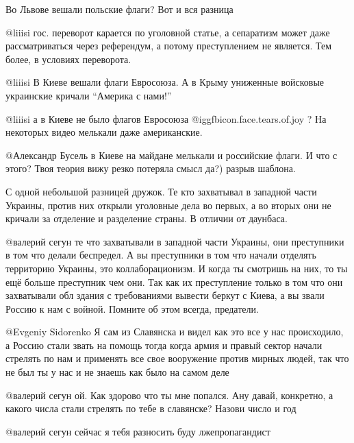 \begin{multicols}{2}
\begin{itemize}
Во Львове вешали польские флаги? Вот и вся разница


@liiisi  гос. переворот карается по  уголовной статье, а сепаратизм может даже
рассматриваться через референдум, а потому преступлением не является. Тем
более, в условиях переворота.

@liiisi  В Киеве вешали флаги Евросоюза. А в Крыму униженные войсковые
украинские кричали \enquote{Америка с нами!}


@liiisi  а в Киеве не было флагов Евросоюза  @igg{fbicon.face.tears.of.joy} ?
На некоторых видео мелькали даже американские.


@Александр Бусель  в Киеве на майдане мелькали и российские флаги. И что с
этого? Твоя теория вижу резко потеряла смысл да?) разрыв шаблона. 


С одной небольшой разницей дружок. Те кто захватывал в западной части Украины,
против них открыли уголовные дела во первых, а во вторых они не кричали за
отделение и разделение страны. В отличии от даунбаса.


@валерий сегун  те что захватывали в западной части Украины, они преступники в
том что делали беспредел. А вы преступники в том что начали отделять
территорию Украины, это коллаборационизм. И когда ты смотришь на них, то ты
ещё больше преступник чем они. Так как их преступление только в том что они
захватывали обл здания с требованиями вывести беркут с Киева, а вы звали
Россию к нам с войной. Помните об этом всегда, предатели. 


@Evgeniy Sidorenko  Я сам из Славянска и видел как это все у нас происходило, а
Россию стали звать на помощь тогда когда армия и правый сектор начали стрелять
по нам и применять все свое вооружение против мирных людей, так что не был ты у
нас и не знаешь как было на самом деле


@валерий сегун  ой. Как здорово что ты мне попался. Ану давай, конкретно, а
какого числа стали стрелять по тебе в славянске? Назови число и год

 @валерий сегун  сейчас я тебя разносить буду лжепропагандист


\end{itemize}
\end{multicols}
